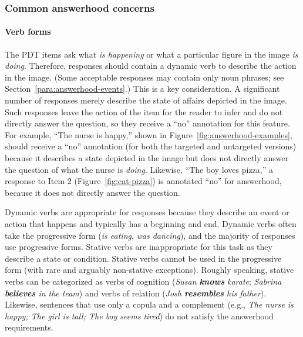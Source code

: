 \documentclass[12pt,notitlepage]{article}
\begin{document}
\subsubsection{Common answerhood concerns}

\paragraph{Verb forms} 
The PDT items ask what \textit{is happening} or what a particular figure in the image \textit{is doing}. Therefore, responses should contain a dynamic verb to describe the action in the image. (Some acceptable responses may contain only noun phrases; see Section~\ref{para:answerhood-events}.) This is a key consideration. A significant number of responses merely describe the state of affairs depicted in the image. Such responses leave the action of the item for the reader to infer and do not directly answer the question, so they receive a ``no'' annotation for this feature. For example, ``The nurse is happy,'' shown in Figure~\ref{fig:answerhood-examples}, should receive a ``no'' annotation (for both the targeted and untargeted versions) because it describes a state depicted in the image but does not directly answer the question of what the nurse is \textit{doing}. Likewise, ``The boy loves pizza,'' a response to Item 2 (Figure~\ref{fig:eat-pizza}) is annotated ``no'' for answerhood, because it does not directly answer the question.

Dynamic verbs are appropriate for responses because they describe an event or action that happens and typically has a beginning and end. Dynamic verbs often take the progressive form (\textit{is eating}, \textit{was dancing}), and the majority of responses use progressive forms. Stative verbs are inappropriate for this task as they describe a state or condition. Stative verbs cannot be used in the progressive form (with rare and arguably non-stative exceptions). Roughly speaking, stative verbs can be categorized as verbs of cognition (\textit{Susan \textbf{knows} karate}; \textit{Sabrina \textbf{believes} in the team}) and verbs of relation (\textit{Josh \textbf{resembles} his father}). Likewise, sentences that use only a copula and a complement (e.g., \textit{The nurse is happy; The girl is tall; The boy seems tired}) do not satisfy the answerhood requirements.
\end{document}
